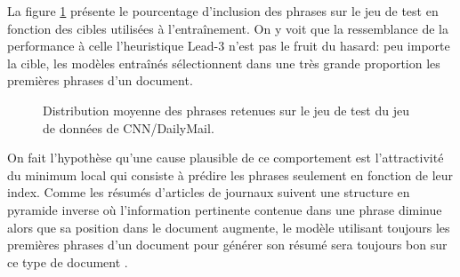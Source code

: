 La figure \ref{fig:distro_predict} présente le pourcentage d'inclusion 
des phrases sur le jeu de test en fonction des cibles utilisées à l'entraînement.
On y voit que la ressemblance de la performance 
à celle l'heuristique Lead-3 n'est pas le fruit du hasard: peu importe la
cible, les modèles entraînés sélectionnent dans une
très grande proportion les premières phrases d'un document. 

\begin{figure}[ht!]
    \centering
  \caption[Distribution de l'inclusion des phrases dans les résumés selon la cible utilisée]
  {Distribution moyenne des phrases retenues
  sur le jeu de test du jeu de données de CNN/DailyMail.}
  \label{fig:distro_predict}
\end{figure}

On fait l'hypothèse qu'une cause plausible de ce comportement est l'attractivité 
du minimum local qui consiste à prédire les phrases seulement en fonction 
de leur index.
Comme les résumés d'articles de journaux suivent une structure en pyramide
inverse où l'information pertinente
contenue dans une phrase diminue alors que sa position dans le document 
augmente, le modèle utilisant toujours les premières phrases d'un 
document pour générer son résumé sera toujours bon
sur ce type de document \citep{kryscinski-etal-2019-neural}.


